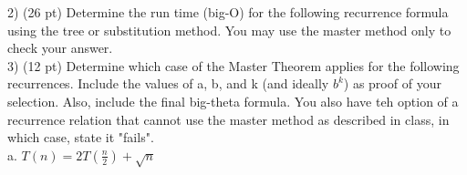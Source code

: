 \documentclass[8pt, a4paper]{article}
\begin{document}
2) (26 pt) Determine the run time (big-O) for the following recurrence formula using the tree or substitution method.
You may use the master method only to check your answer. \\


3) (12 pt) Determine which case of the Master Theorem applies for the following recurrences. Include the values of
a, b, and k (and ideally $b^k$) as proof of your selection. Also, include the final big-theta formula. 
You also have teh option of a recurrence relation that cannot use the master method as described in class, 
in which case, state it "fails". \\

  a. $ T(n) = 2T (\frac{n}{2}) + \sqrt{n} $
\end{document}
